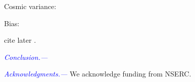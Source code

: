\documentclass[aps,prd,twocolumn,amsmath,amssymb,amsfont,superscriptaddress]{revtex4-1}
\newcommand{\tcb}{\textcolor{blue}}
\begin{document}
Cosmic variance:

Bias:

cite later \citep{2018MNRAS.tmp.2447C}.

\tcb{\textit{Conclusion.---}} 

\tcb{\textit{Acknowledgments.---}}
We acknowledge funding from NSERC.



%

\end{document}
